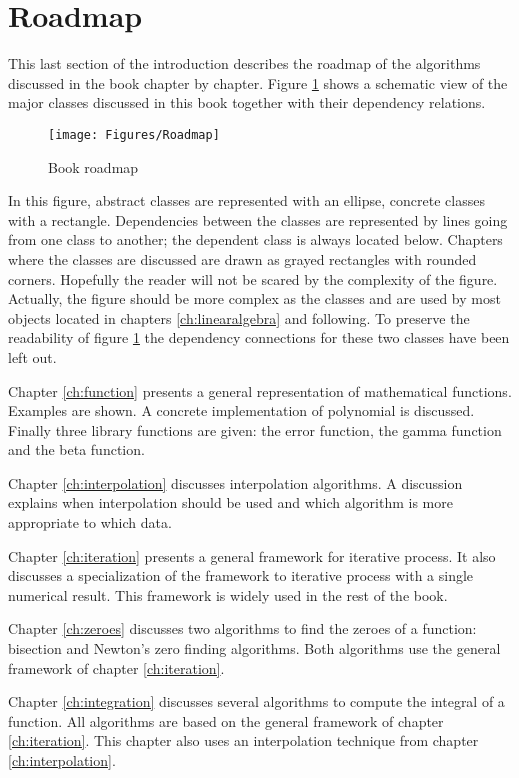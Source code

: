 \section{Roadmap}
This last section of the introduction describes the roadmap of
the algorithms discussed in the book chapter by chapter. Figure
\ref{fig:roadmap} shows a schematic view of the major classes
discussed in this book together with their dependency relations.
\begin{figure}
\centering\texttt{[image: Figures/Roadmap]}
\caption{Book roadmap} \label{fig:roadmap}
\end{figure}
In this figure, abstract classes are represented with an ellipse,
concrete classes with a rectangle. Dependencies between the
classes are represented by lines going from one class to another;
the dependent class is always located below. Chapters where the
classes are discussed are drawn as grayed rectangles with rounded
corners. Hopefully the reader will not be scared by the complexity
of the figure. Actually, the figure should be more complex as the
classes  and  are used by most objects
located in chapters \ref{ch:linearalgebra} and following. To
preserve the readability of figure \ref{fig:roadmap} the
dependency connections for these two classes have been left out.

Chapter \ref{ch:function} presents a general representation of
mathematical functions. Examples are shown. A concrete
implementation of polynomial is discussed. Finally three library
functions are given: the error function, the gamma function and
the beta function.

Chapter \ref{ch:interpolation} discusses interpolation algorithms.
A discussion explains when interpolation should be used and which
algorithm is more appropriate to which data.

Chapter \ref{ch:iteration} presents a general framework for
iterative process. It also discusses a specialization of the
framework to iterative process with a single numerical result.
This framework is widely used in the rest of the book.

Chapter \ref{ch:zeroes} discusses two algorithms to find the
zeroes of a function: bisection and Newton's zero finding
algorithms. Both algorithms use the general framework of chapter
\ref{ch:iteration}.

Chapter \ref{ch:integration} discusses several algorithms to
compute the integral of a function. All algorithms are based on
the general framework of chapter \ref{ch:iteration}. This chapter
also uses an interpolation technique from chapter
\ref{ch:interpolation}.

